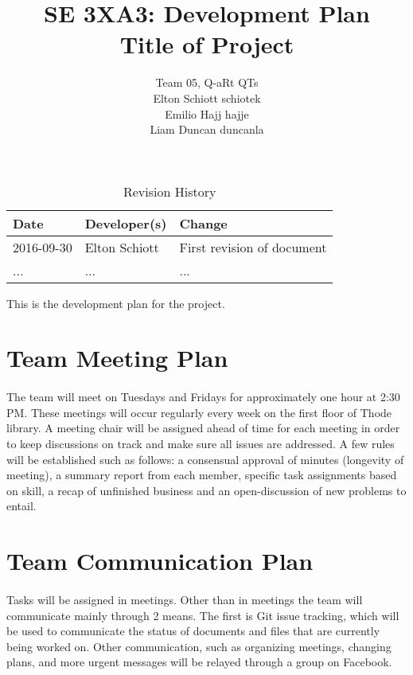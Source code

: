\documentclass{article}
\title{SE 3XA3: Development Plan\\Title of Project}
\author{Team 05, Q-aRt QTs
		\\ Elton Schiott schiotek
		\\ Emilio Hajj hajje
		\\ Liam Duncan duncanla
}
\date{}
\begin{document}
\begin{table}[hp]
\caption{Revision History} \label{TblRevisionHistory}
\begin{tabularx}{\textwidth}{llX}
\toprule
\textbf{Date} & \textbf{Developer(s)} & \textbf{Change}\\
\midrule
2016-09-30 & Elton Schiott & First revision of document\\
... & ... & ...\\
\bottomrule
\end{tabularx}
\end{table}

\newpage

\maketitle

This is the development plan for the project.

\section{Team Meeting Plan}
	
	\paragraph{}
		
		The team will meet on Tuesdays and Fridays for approximately one hour 
		at 2:30 PM. These meetings will occur regularly every week on the first 
		floor of Thode library. A meeting chair will be assigned ahead of time 
		for each meeting in order to keep discussions on track and make sure 
		all issues are addressed. A few rules will be established such as follows: a consensual approval of minutes (longevity of meeting), a summary report from each member, specific task assignments based on skill, a recap of unfinished business and an open-discussion of new problems to entail. 

\section{Team Communication Plan}
	
	\paragraph{}
	
		Tasks will be assigned in meetings. Other than in meetings the team 
		will communicate mainly through 2 means. The first is Git issue 
		tracking, which will be used to communicate the status of documents and 
		files that are currently being worked on. Other communication, such as 
		organizing meetings, changing plans, and more urgent messages will be 
		relayed through a group on Facebook.
\end{document}

